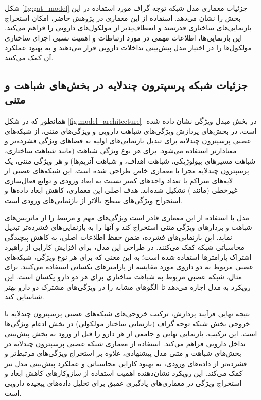شکل \ref{fig:gat_model} جزئیات معماری مدل شبکه توجه گراف مورد استفاده در این بخش را نشان می‌دهد. استفاده از این معماری در پژوهش حاضر، امکان استخراج بازنمایی‌های ساختاری قدرتمند و انعطاف‌پذیر از مولکول‌های دارویی را فراهم می‌کند. این بازنمایی‌ها، اطلاعات مهمی در مورد ارتباطات و اهمیت نسبی اجزای ساختاری مولکول‌ها را در اختیار مدل پیش‌بینی تداخلات دارویی قرار می‌دهند و به بهبود عملکرد آن کمک می‌کنند.

\subsection{جزئیات شبکه‌ پرسپترون چندلایه در بخش‌های شباهت و متنی}

همانطور که در شکل \ref{fig:model_architecture}- در بخش مبدل ویژگی نشان داده شده است، در بخش‌های پردازش ویژگی‌های شباهت دارویی و ویژگی‌های متنی، از شبکه‌های عصبی پرسپترون چندلایه برای تبدیل بازنمایی‌های اولیه به فضاهای ویژگی فشرده‌تر و معنادارتر استفاده می‌شود. برای هر نوع ویژگی شباهت (مانند شباهت ساختاری، شباهت مسیرهای بیولوژیکی، شباهت اهداف، و شباهت آنزیم‌ها) و هر ویژگی متنی، یک پرسپترون چندلایه مجزا با معماری خاص طراحی شده است. این شبکه‌های عصبی از لایه‌های متراکم با تعداد واحدهای کمتر نسبت به ابعاد ورودی و توابع فعال‌سازی غیرخطی (مانند ) تشکیل شده‌اند. هدف اصلی این معماری، کاهش ابعاد داده‌ها و استخراج ویژگی‌های سطح بالاتر از بازنمایی‌های ورودی است.

مدل با استفاده از این معماری قادر است ویژگی‌های مهم و مرتبط را از ماتریس‌های شباهت و بردارهای ویژگی متنی استخراج کند و آنها را به بازنمایی‌های فشرده‌تر تبدیل نماید. این بازنمایی‌های فشرده، ضمن حفظ اطلاعات اصلی، به کاهش پیچیدگی محاسباتی شبکه کمک می‌کنند. در طراحی این مدل، برای افزایش کارایی از راهبرد اشتراک پارامترها استفاده شده است؛ به این معنی که برای هر نوع ویژگی، شبکه‌های عصبی مربوط به دو داروی مورد مقایسه از پارامترهای یکسانی استفاده می‌کنند. برای مثال، شبکه عصبی مربوط به شباهت ساختاری برای هر دو دارو یکسان است. این رویکرد به مدل اجازه می‌دهد تا الگوهای مشابه را در ویژگی‌های مشترک دو دارو بهتر شناسایی کند.

نتیجه نهایی فرآیند پردازش، ترکیب خروجی‌های شبکه‌های عصبی پرسپترون چندلایه با خروجی بخش شبکه توجه گراف (بازنمایی ساختار مولکولی) در بخش ادغام ویژگی‌ها است. این ترکیب، بازنمایی نهایی و جامعی از هر دارو را قبل از ورود به بخش پیش‌بینی تداخل دارویی فراهم می‌کند. استفاده از معماری شبکه عصبی پرسپترون چندلایه در بخش‌های شباهت و متنی مدل پیشنهادی، علاوه بر استخراج ویژگی‌های مرتبط‌تر و فشرده‌تر از داده‌های ورودی، به بهبود کارایی محاسباتی و عملکرد پیش‌بینی مدل نیز کمک می‌کند. این رویکرد نشان‌دهنده اهمیت استفاده از سازوکار‌های کاهش ابعاد و استخراج ویژگی در معماری‌های یادگیری عمیق برای تحلیل داده‌های پیچیده دارویی است.

